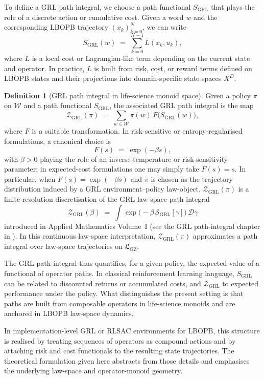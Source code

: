 \documentclass[11pt]{book}
\theoremstyle{plain}
\theoremstyle{definition}
\newtheorem{definition}[theorem]{Definition}
\theoremstyle{remark}
\newcommand{\GZLS}{\ensuremath{\mathfrak{L}_{\mathrm{GZ}}}}       \newcommand{\GZLT}{\ensuremath{M_{!w}}}                           \newcommand{\GZLOC}{\ensuremath{A_M}}                             \newcommand{\GZLCurv}{\ensuremath{\mathcal{F}_{\mathrm{law}}}}
\begin{document}
To define a GRL path integral, we choose a path functional
$S_{\mathrm{GRL}}$ that plays the role of a discrete action or
cumulative cost. Given a word $w$ and the corresponding LBOPB
trajectory $(x_{k})_{k=0}^{N}$, we can write
\[
  S_{\mathrm{GRL}}(w)
  \;=\;
  \sum_{k=0}^{N-1} L(x_{k}, u_{k}),
\]
where $L$ is a local cost or Lagrangian-like term depending on the
current state and operator. In practice, $L$ is built from risk, cost,
or reward terms defined on LBOPB states and their projections into
domain-specific state spaces $X^{D}$.

\begin{definition}[GRL path integral in life-science monoid space]
Given a policy $\pi$ on $\mathcal{W}$ and a path functional
$S_{\mathrm{GRL}}$, the associated GRL path integral is the map
\[
  \mathcal{Z}_{\mathrm{GRL}}(\pi)
  \;=\;
  \sum_{w \in \mathcal{W}} \pi(w)\,
  F\bigl(S_{\mathrm{GRL}}(w)\bigr),
\]
where $F$ is a suitable transformation. In risk-sensitive or
entropy-regularised formulations, a canonical choice is
\[
  F(s) \;=\; \exp(-\beta s),
\]
with $\beta>0$ playing the role of an inverse-temperature or
risk-sensitivity parameter; in expected-cost formulations one may
simply take $F(s) = s$.
In particular, when $F(s) = \exp(-\beta s)$ and $\pi$ is chosen as
the trajectory distribution induced by a GRL environment--policy
law-object, $\mathcal{Z}_{\mathrm{GRL}}(\pi)$ is a finite-resolution
discretisation of the GRL law-space path integral
\[
  \mathcal{Z}_{\mathrm{GRL}}(\beta)
  \;=\;
  \int \exp\!\bigl(-\beta\,\mathcal{S}_{\mathrm{GRL}}[\gamma]\bigr)\,
  \mathcal{D}\gamma
\]
introduced in Applied Mathematics Volume~I
(see the GRL path-integral chapter in \cite{GaoZhengAppVol1}).
In this continuous law-space interpretation,
$\mathcal{Z}_{\mathrm{GRL}}(\pi)$ approximates a path integral over
law-space trajectories on $\GZLS$.
\end{definition}

The GRL path integral thus quantifies, for a given policy, the expected
value of a functional of operator paths. In classical reinforcement
learning language, $S_{\mathrm{GRL}}$ can be related to discounted
returns or accumulated costs, and $\mathcal{Z}_{\mathrm{GRL}}$ to
expected performance under the policy. What distinguishes the present
setting is that paths are built from composable operators in
life-science monoids and are anchored in LBOPB law-space dynamics.

In implementation-level GRL or RLSAC environments for LBOPB, this
structure is realised by treating sequences of operators as compound
actions and by attaching risk and cost functionals to the resulting
state trajectories. The theoretical formulation given here abstracts
from those details and emphasises the underlying law-space and
operator-monoid geometry.
\end{document}
